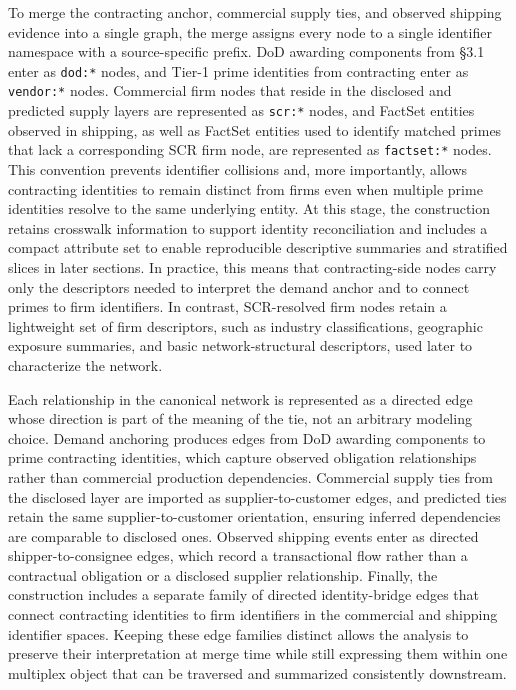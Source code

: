 To merge the contracting anchor, commercial supply ties, and observed shipping evidence into a single graph, the merge assigns every node to a single identifier namespace with a source-specific prefix. DoD awarding components from \S3.1 enter as \texttt{dod:*} nodes, and Tier-1 prime identities from contracting enter as \texttt{vendor:*} nodes. Commercial firm nodes that reside in the disclosed and predicted supply layers are represented as \texttt{scr:*} nodes, and FactSet entities observed in shipping, as well as FactSet entities used to identify matched primes that lack a corresponding SCR firm node, are represented as \texttt{factset:*} nodes. This convention prevents identifier collisions and, more importantly, allows contracting identities to remain distinct from firms even when multiple prime identities resolve to the same underlying entity. At this stage, the construction retains crosswalk information to support identity reconciliation and includes a compact attribute set to enable reproducible descriptive summaries and stratified slices in later sections. In practice, this means that contracting-side nodes carry only the descriptors needed to interpret the demand anchor and to connect primes to firm identifiers. In contrast, SCR-resolved firm nodes retain a lightweight set of firm descriptors, such as industry classifications, geographic exposure summaries, and basic network-structural descriptors, used later to characterize the network.

Each relationship in the canonical network is represented as a directed edge whose direction is part of the meaning of the tie, not an arbitrary modeling choice. Demand anchoring produces edges from DoD awarding components to prime contracting identities, which capture observed obligation relationships rather than commercial production dependencies. Commercial supply ties from the disclosed layer are imported as supplier-to-customer edges, and predicted ties retain the same supplier-to-customer orientation, ensuring inferred dependencies are comparable to disclosed ones. Observed shipping events enter as directed shipper-to-consignee edges, which record a transactional flow rather than a contractual obligation or a disclosed supplier relationship. Finally, the construction includes a separate family of directed identity-bridge edges that connect contracting identities to firm identifiers in the commercial and shipping identifier spaces. Keeping these edge families distinct allows the analysis to preserve their interpretation at merge time while still expressing them within one multiplex object that can be traversed and summarized consistently downstream.

